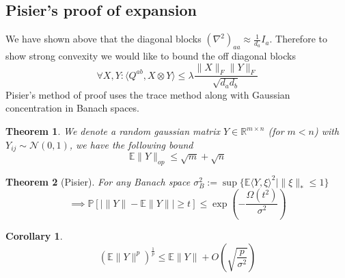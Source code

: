 \documentclass{article}
\newtheorem{theorem}{Theorem}
\newtheorem{corollary}{Corollary}
\newcommand{\R}{{\mathbb{R}}}
\newcommand{\E}{\mathbb{E}}
\renewcommand{\Pr}{\mathbb{P}}
\begin{document}
\subsection{Pisier's proof of expansion}
We have shown above that the diagonal blocks $(\nabla^{2})_{aa} \approx \frac{1}{d_{a}} I_{a}$. Therefore to show strong convexity we would like to bound the off diagonal blocks
\[ \forall X,Y:  \langle Q^{ab}, X \otimes Y \rangle \leq \lambda \frac{\|X\|_{F} \|Y\|_{F}}{\sqrt{d_{a} d_{b}}}   \]
Pisier's method of proof uses the trace method along with Gaussian concentration in Banach spaces.

\begin{theorem}
We denote a random gaussian matrix $Y \in \R^{m \times n}$ (for $m < n$) with $Y_{ij} \sim \mathcal{N}(0,1)$, we have the following bound
\[ \E \|Y\|_{op} \leq \sqrt{m} + \sqrt{n} \]
\end{theorem}

%

\begin{theorem} [Pisier]
For any Banach space $\sigma_{B}^{2} := \sup \{ \E \langle Y, \xi \rangle^{2} \mid \|\xi\|_{*} \leq 1 \} $
\[ \implies \Pr [ | \|Y\| - \E \|Y\| | \geq t ] \leq \exp \left( - \frac{\Omega(t^{2})}{\sigma^{2}} \right)   \]
\end{theorem}

\begin{corollary}
\[ (\E \|Y\|^{p})^{\frac{1}{p}} \leq \E \|Y\| + O \left( \sqrt{\frac{p}{\sigma^{2}}} \right)   \]
\end{corollary}
\end{document}
